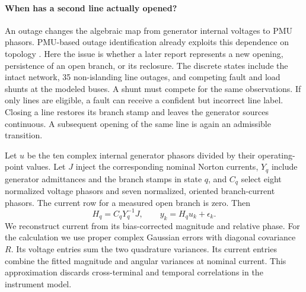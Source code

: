 \paragraph{When has a second line actually opened?}
An outage changes the algebraic map from generator internal voltages
to PMU phasors. PMU-based outage identification already exploits
this dependence on topology \cite{tate2008outage}. Here the issue
is whether a later report represents a new opening, persistence of
an open branch, or its reclosure. The discrete states include the
intact network, 35 non-islanding line outages, and competing fault
and load shunts at the modeled buses. A shunt must compete for the
same observations. If only lines are eligible, a fault can receive
a confident but incorrect line label.
Closing a line restores its branch stamp and leaves the generator
sources continuous. A subsequent opening of the same line is again
an admissible transition.

Let $u$ be the ten complex internal generator phasors divided by
their operating-point values. Let $J$ inject the corresponding
nominal Norton currents, $Y_q$ include generator admittances and
the branch stamps in state $q$, and $C_q$ select eight normalized
voltage phasors and seven normalized, oriented branch-current phasors.
The current row for a measured open branch is zero. Then
\[
 H_q=C_qY_q^{-1}J,\qquad y_k=H_qu_k+\epsilon_k.
\]
We reconstruct current from its bias-corrected magnitude and
relative phase. For the calculation we use proper complex Gaussian
errors with diagonal covariance $R$. Its voltage entries sum the
two quadrature variances. Its current entries combine the fitted
magnitude and angular variances at nominal current. This approximation
discards cross-terminal and temporal correlations in the instrument model.

